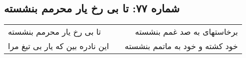 \begin{center}
\section*{شماره ۷۷: تا بی رخ یار محرمم بنشسته}
\label{sec:077}
\begin{longtable}{l p{0.5cm} r}
تا بی رخ یار محرمم بنشسته
&&
برخاستهای به صد غمم بنشسته
\\
این نادره بین که یار بی تیغ مرا
&&
خود کشته و خود به ماتمم بنشسته
\\
\end{longtable}
\end{center}
